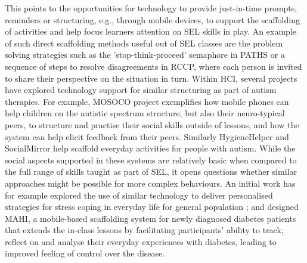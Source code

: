 \documentclass[prodmode,acmtochi]{acmsmall}
\begin{document}
This points to the opportunities for technology to provide just-in-time prompts, reminders or structuring, e.g.,  through mobile devices, to support the scaffolding of activities and help focus learners attention on SEL skills in play. 
%
An example of such direct scaffolding methods useful out of SEL classes are the problem solving strategies such as the 'stop-think-proceed' semaphore in PATHS or a sequence of steps to resolve disagreements in RCCP, where each person is invited to share their perspective on the situation in turn. Within HCI, several projects have explored technology support for similar structuring as part of autism therapies. For example, MOSOCO project \cite{Escobedo2012,Tentori2010} exemplifies how mobile phones can help children on the autistic spectrum structure, but also their neuro-typical peers, to structure and practise their social skills outside of lessons, and how the system can help elicit feedback from their peers. Similarly HygieneHelper \cite{Hayes2013} and SocialMirror \cite{Hong2012} help scaffold everyday activities for people with autism. While the social aspects supported in these systems are relatively basic when compared to the full range of skills taught as part of SEL, it opens questions whether similar approaches might be possible for more complex behaviours. An initial work has for example explored the use of similar technology to deliver personalised strategies for stress coping in everyday life for general population \cite{Paredes2014}; and  designed MAHI, a mobile-based scaffolding system for newly diagnosed diabetes patients that extends the in-class lessons by facilitating participants' ability to track, reflect on and analyse their everyday experiences with diabetes, leading to improved feeling of control over the disease.
\end{document}
